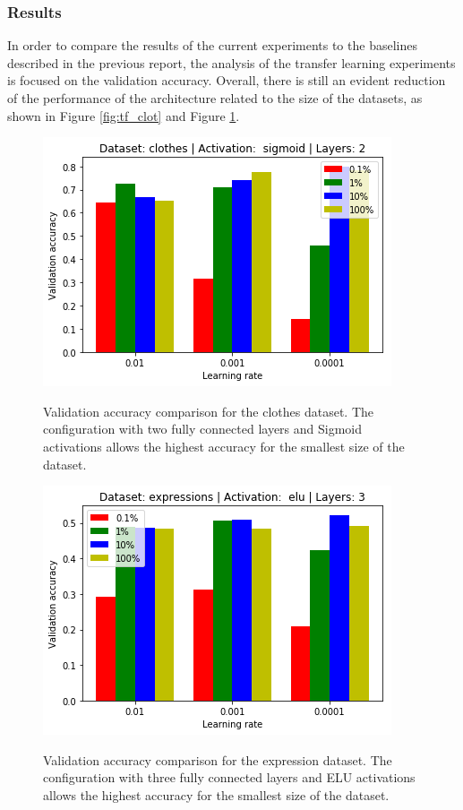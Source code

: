 \documentclass{article}
\begin{document}
\subsubsection{\textbf{Results}}

In order to compare the results of the current experiments to the baselines described in the previous report, the analysis of the transfer learning experiments is focused on the validation accuracy. Overall, there is still an evident reduction of the performance of the architecture related to the size of the datasets, as shown in Figure \ref{fig:tf_clot} and Figure \ref{fig:tf_exp}.

\begin{figure}
  \vskip 5mm
    \begin{center}
        \includegraphics[scale=0.45]{accuracy_reduction_00.png}
        \caption{Validation accuracy comparison for the clothes dataset. The configuration with two fully connected layers and Sigmoid activations allows the highest accuracy for the smallest size of the dataset.}
        \label{fig:tf_clot}
      \endminipage\hfill
        \includegraphics[scale=0.45]{accuracy_reduction_01.png}
        \caption{Validation accuracy comparison for the expression dataset. The configuration with three fully connected layers and ELU activations allows the highest accuracy for the smallest size of the dataset.}
        \label{fig:tf_exp}
      \endminipage\hfill
    \end{center}
  \vskip -5mm
\end{figure}
\end{document}
